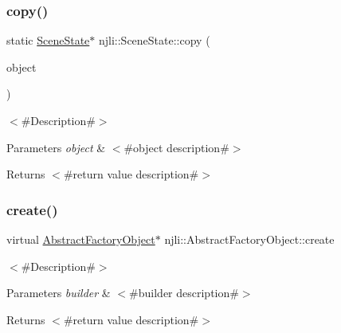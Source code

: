 \subsubsection{\texorpdfstring{copy()}{copy()}}
{\footnotesize\ttfamily static \mbox{\hyperlink{classnjli_1_1_scene_state}{Scene\+State}}$\ast$ njli\+::\+Scene\+State\+::copy (\begin{DoxyParamCaption}\item[{const \mbox{\hyperlink{classnjli_1_1_scene_state}{Scene\+State}} \&}]{object }\end{DoxyParamCaption})\hspace{0.3cm}{\ttfamily [static]}}

$<$\#\+Description\#$>$


\begin{DoxyParams}{Parameters}
{\em object} & $<$\#object description\#$>$\\
\hline
\end{DoxyParams}
\begin{DoxyReturn}{Returns}
$<$\#return value description\#$>$ 
\end{DoxyReturn}
\mbox{\label{classnjli_1_1_scene_state_a83a8876ae63b92804004cf3febe76573}} 
\subsubsection{\texorpdfstring{create()}{create()}\hspace{0.1cm}{\footnotesize\ttfamily [1/3]}}
{\footnotesize\ttfamily virtual \mbox{\hyperlink{classnjli_1_1_abstract_factory_object}{Abstract\+Factory\+Object}}$\ast$ njli\+::\+Abstract\+Factory\+Object\+::create}

$<$\#\+Description\#$>$


\begin{DoxyParams}{Parameters}
{\em builder} & $<$\#builder description\#$>$\\
\hline
\end{DoxyParams}
\begin{DoxyReturn}{Returns}
$<$\#return value description\#$>$ 
\end{DoxyReturn}
\mbox{\label{classnjli_1_1_scene_state_a8a6f3696b73d1c5f62ef2aaeb7133cec}} 
